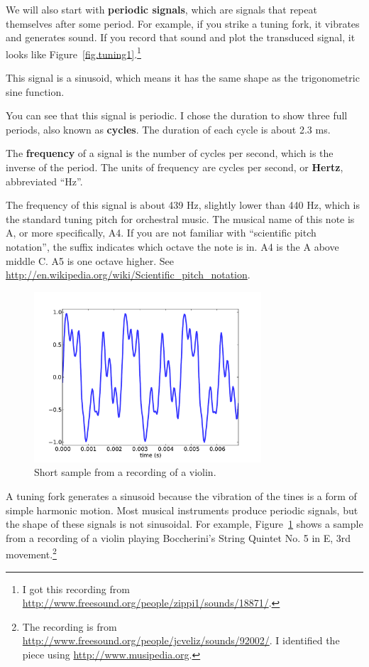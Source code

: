 \documentclass[12pt]{book}
\begin{document}
We will also start with {\bf periodic signals}, which are signals
that repeat themselves after some period.  For example, if you
strike a tuning fork, it vibrates and generates sound.  If you
record that sound and plot the transduced signal, it looks like
Figure~\ref{fig.tuning1}.\footnote{I got this recording from
\url{http://www.freesound.org/people/zippi1/sounds/18871/}.}

This signal is a sinusoid, which means it has the same shape as
the trigonometric sine function. 

You can see that this signal is periodic.  I chose the duration
to show three full periods, also known as {\bf cycles}.
The duration of each cycle is
about 2.3 ms.

The {\bf frequency} of a signal is the number of cycles
per second, which is the inverse of the period.
The units of frequency are cycles per second, or {\bf Hertz},
abbreviated ``Hz''.

The frequency of this signal is about 439 Hz, slightly lower than 440
Hz, which is the standard tuning pitch for orchestral music.  The
musical name of this note is A, or more specifically, A4.  If you are
not familiar with ``scientific pitch notation'', the suffix indicates
which octave the note is in.  A4 is the A above middle C.  A5 is one
octave higher.  See
\url{http://en.wikipedia.org/wiki/Scientific_pitch_notation}.

\begin{figure}
\centerline{\includegraphics[height=2.5in]{figs/violin1.pdf}}
\caption{Short sample from a recording of a violin.}
\label{fig.violin1}
\end{figure}

A tuning fork generates a sinusoid because the vibration of the tines
is a form of simple harmonic motion.  Most musical instruments
produce periodic signals, but the shape of these signals is not
sinusoidal.  For example, Figure~\ref{fig.violin1} shows a sample
from a recording of a violin playing
Boccherini's String Quintet No. 5 in E, 3rd
movement.\footnote{The recording is from
  \url{http://www.freesound.org/people/jcveliz/sounds/92002/}.
I identified the piece using \url{http://www.musipedia.org}.}
\end{document}
